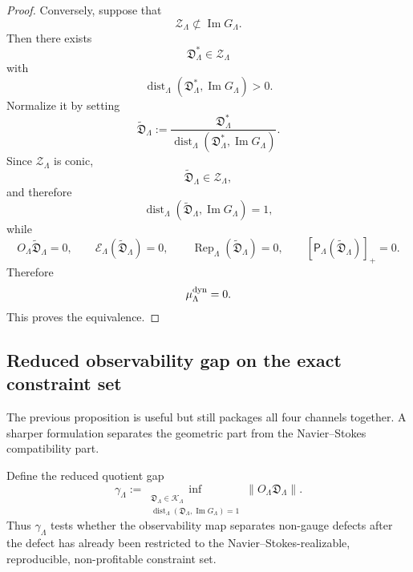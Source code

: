\documentclass[11pt]{article}
\numberwithin{equation}{section}
\begin{document}
\begin{proof}
Conversely, suppose that
\[
        \mathcal Z_\Lambda
        \not\subset
        \operatorname{Im}G_\Lambda.
\]
Then there exists
\[
        \mathfrak D_\Lambda^\ast\in\mathcal Z_\Lambda
\]
with
\[
        \operatorname{dist}_\Lambda
        (\mathfrak D_\Lambda^\ast,\operatorname{Im}G_\Lambda)>0.
\]
Normalize it by setting
\[
        \widetilde{\mathfrak D}_\Lambda
        :=
        \frac{\mathfrak D_\Lambda^\ast}
        {\operatorname{dist}_\Lambda
        (\mathfrak D_\Lambda^\ast,\operatorname{Im}G_\Lambda)} .
\]
Since \(\mathcal Z_\Lambda\) is conic,
\[
        \widetilde{\mathfrak D}_\Lambda\in\mathcal Z_\Lambda,
\]
and therefore
\[
        \operatorname{dist}_\Lambda
        (\widetilde{\mathfrak D}_\Lambda,\operatorname{Im}G_\Lambda)=1,
\]
while
\[
        O_\Lambda\widetilde{\mathfrak D}_\Lambda=0,
        \qquad
        \mathcal E_\Lambda(\widetilde{\mathfrak D}_\Lambda)=0,
        \qquad
        \operatorname{Rep}_\Lambda(\widetilde{\mathfrak D}_\Lambda)=0,
        \qquad
        [\mathsf P_\Lambda(\widetilde{\mathfrak D}_\Lambda)]_+=0.
\]
Therefore
\[
        \mu_\Lambda^{\rm dyn}=0.
\]
This proves the equivalence.
\end{proof}

\subsection{Reduced observability gap on the exact constraint set}

The previous proposition is useful but still packages all four channels
together.  A sharper formulation separates the geometric part from the
Navier--Stokes compatibility part.

Define the reduced quotient gap
\[
\boxed{
        \gamma_\Lambda
        :=
        \inf_{\substack{
        \mathfrak D_\Lambda\in\mathcal K_\Lambda\\
        \operatorname{dist}_\Lambda
        (\mathfrak D_\Lambda,\operatorname{Im}G_\Lambda)=1
        }}
        \|O_\Lambda\mathfrak D_\Lambda\| .
}
\]
Thus \(\gamma_\Lambda\) tests whether the observability map separates
non-gauge defects after the defect has already been restricted to the
Navier--Stokes-realizable, reproducible, non-profitable constraint set.
\end{document}

